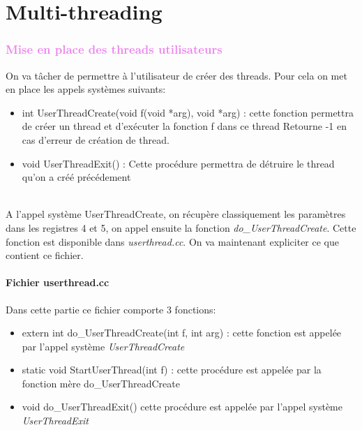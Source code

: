 \documentclass[a4paper,10pt]{report}
\begin{document}
    \part{Multi-threading}
    \textcolor{Violet}{\section{Mise en place des threads utilisateurs}}
  On va tâcher de permettre à l'utilisateur de créer des threads. Pour cela on met en place les appels systèmes suivants:
  \begin{itemize}
   \item int UserThreadCreate(void f(void *arg), void *arg) : cette fonction permettra de créer un thread et d'exécuter la fonction f dans ce thread
   Retourne -1 en cas d'erreur de création de thread.
   \item void UserThreadExit() : Cette procédure permettra de détruire le thread qu'on a créé précédement
  \end{itemize}
  
  ~~\\
  
  A l'appel système UserThreadCreate, on récupère classiquement les paramètres dans les registres 4 et 5, on appel ensuite la fonction \emph{do\_UserThreadCreate}.
  Cette fonction est disponible dans \emph{userthread.cc}. On va maintenant expliciter ce que contient ce fichier. 
  \textcolor{NavyBlue}{\subsection{Fichier userthread.cc}}
    Dans cette partie ce fichier comporte 3 fonctions: 
    \begin{itemize}
     \item extern int do\_UserThreadCreate(int f, int arg) : cette fonction est appelée par l'appel système \emph{UserThreadCreate}
     \item static void StartUserThread(int f) : cette procédure est appelée par la fonction mère do\_UserThreadCreate
     \item void do\_UserThreadExit() cette procédure est appelée par l'appel système \emph{UserThreadExit}
    \end{itemize}
    
\end{document}
